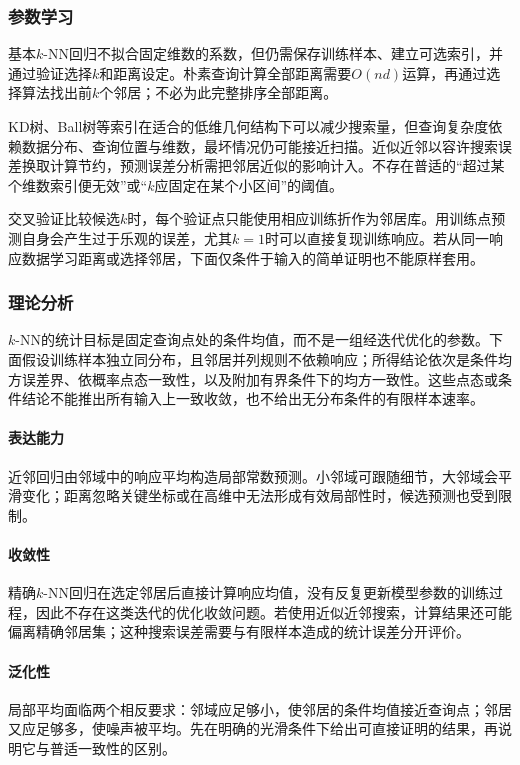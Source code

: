 \subsubsection{参数学习}

基本$k$-NN回归不拟合固定维数的系数，但仍需保存训练样本、建立可选索引，并通过验证选择$k$和距离设定。朴素查询计算全部距离需要$O(nd)$运算，再通过选择算法找出前$k$个邻居；不必为此完整排序全部距离。

KD树、Ball树等索引在适合的低维几何结构下可以减少搜索量，但查询复杂度依赖数据分布、查询位置与维数，最坏情况仍可能接近扫描。近似近邻以容许搜索误差换取计算节约，预测误差分析需把邻居近似的影响计入。不存在普适的“超过某个维数索引便无效”或“$k$应固定在某个小区间”的阈值。

交叉验证比较候选$k$时，每个验证点只能使用相应训练折作为邻居库。用训练点预测自身会产生过于乐观的误差，尤其$k=1$时可以直接复现训练响应。若从同一响应数据学习距离或选择邻居，下面仅条件于输入的简单证明也不能原样套用。

\subsubsection{理论分析}
\label{sec:regression-knn-theory}

$k$-NN的统计目标是固定查询点处的条件均值，而不是一组经迭代优化的参数。下面假设训练样本独立同分布，且邻居并列规则不依赖响应；所得结论依次是条件均方误差界、依概率点态一致性，以及附加有界条件下的均方一致性。这些点态或条件结论不能推出所有输入上一致收敛，也不给出无分布条件的有限样本速率。

\paragraph{表达能力}
近邻回归由邻域中的响应平均构造局部常数预测。小邻域可跟随细节，大邻域会平滑变化；距离忽略关键坐标或在高维中无法形成有效局部性时，候选预测也受到限制。

\paragraph{收敛性}
精确$k$-NN回归在选定邻居后直接计算响应均值，没有反复更新模型参数的训练过程，因此不存在这类迭代的优化收敛问题。若使用近似近邻搜索，计算结果还可能偏离精确邻居集；这种搜索误差需要与有限样本造成的统计误差分开评价。

\paragraph{泛化性}
局部平均面临两个相反要求：邻域应足够小，使邻居的条件均值接近查询点；邻居又应足够多，使噪声被平均。先在明确的光滑条件下给出可直接证明的结果，再说明它与普适一致性的区别。

